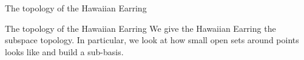 \documentclass[14pt]{beamer}
\begin{document}
\begin{frame}{The topology of the Hawaiian Earring}
\begin{center}

    \end{center}
\end{frame}




\begin{frame}{The topology of the Hawaiian Earring}
    We give the Hawaiian Earring the subspace topology. In particular, we look at how small open sets around points looks like and build a sub-basis.
    \begin{center}
 


\begin{tikzpicture}[x=0.75pt,y=0.75pt,yscale=-1,xscale=1]


\end{tikzpicture}
\end{center}
\end{frame}
\end{document}
